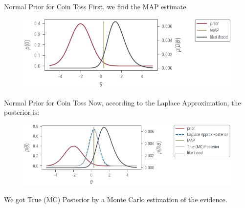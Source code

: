 \documentclass{beamer}
\begin{document}
\begin{frame}{Normal Prior for Coin Toss}
    First, we find the MAP estimate.
    \begin{figure}
        \includegraphics[]{../figures/laplace-approx/normal-prior-coin-toss-map.pdf}
    \end{figure}
\end{frame}

\begin{frame}{Normal Prior for Coin Toss}
    Now, according to the Laplace Approximation, the posterior is:
    \begin{figure}
        \includegraphics[]{../figures/laplace-approx/normal-prior-coin-toss-laplace.pdf}
    \end{figure}
    We got True (MC) Posterior by a Monte Carlo estimation of the evidence.
\end{frame}
\end{document}
